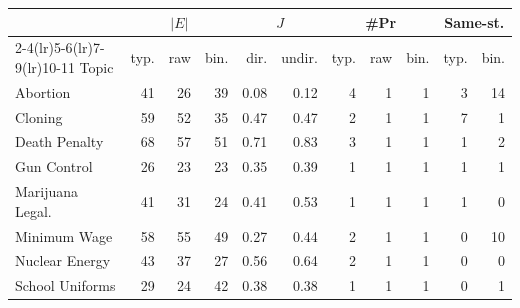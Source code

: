 \begin{tabular}{lrrrrrrrrrr}
  \toprule
  & \multicolumn{3}{c}{$|E|$} & \multicolumn{2}{c}{$J$}
  & \multicolumn{3}{c}{\#Pr} & \multicolumn{2}{c}{Same-st.} \\
  \cmidrule(lr){2-4}\cmidrule(lr){5-6}\cmidrule(lr){7-9}\cmidrule(lr){10-11}
  Topic & typ. & raw & bin. & dir. & undir. & typ. & raw & bin. & typ. & bin. \\
  \midrule
  Abortion          & 41 & 26 & 39 & 0.08 & 0.12 & 4 & 1 & 1 & 3 & 14 \\
  Cloning           & 59 & 52 & 35 & 0.47 & 0.47 & 2 & 1 & 1 & 7 & 1 \\
  Death Penalty     & 68 & 57 & 51 & 0.71 & 0.83 & 3 & 1 & 1 & 1 & 2 \\
  Gun Control       & 26 & 23 & 23 & 0.35 & 0.39 & 1 & 1 & 1 & 1 & 1 \\
  Marijuana Legal.  & 41 & 31 & 24 & 0.41 & 0.53 & 1 & 1 & 1 & 1 & 0 \\
  Minimum Wage      & 58 & 55 & 49 & 0.27 & 0.44 & 2 & 1 & 1 & 0 & 10 \\
  Nuclear Energy    & 43 & 37 & 27 & 0.56 & 0.64 & 2 & 1 & 1 & 0 & 0 \\
  School Uniforms   & 29 & 24 & 42 & 0.38 & 0.38 & 1 & 1 & 1 & 0 & 1 \\
  \bottomrule
\end{tabular}
